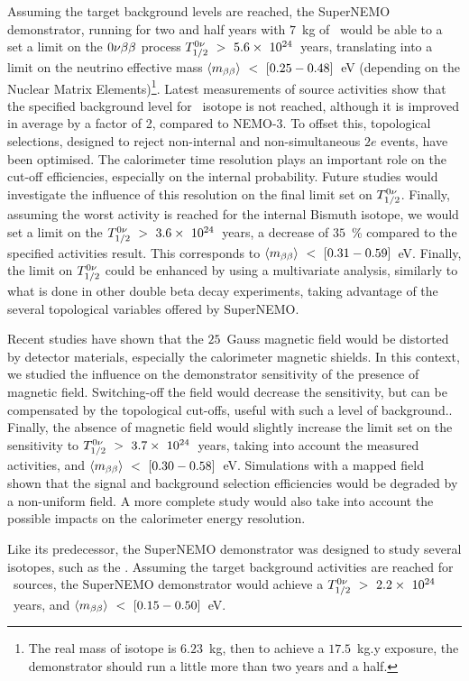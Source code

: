 Assuming the target background levels are reached, the SuperNEMO demonstrator, running for two and half years with $7$~kg of \Se\ would be able to a set a limit on the $0\nu\beta\beta$ process $T_{1/2}^{0\nu}~>~5.6\times~10^{24}$~years, translating into a limit on the neutrino effective mass $\langle m_{\beta\beta}\rangle~<~[0.25-0.48]$~eV (depending on the Nuclear Matrix Elements)\footnote{The real mass of isotope is $6.23$~kg, then to achieve a $17.5$~kg.y exposure, the demonstrator should run a little more than two years and a half.}.
Latest measurements of source activities show that the specified background level for \Tl\ isotope is not reached, although it is improved in average by a factor of 2, compared to NEMO-$3$.
To offset this, topological selections, designed to reject non-internal and non-simultaneous $2e$ events, have been optimised.
The calorimeter time resolution plays an important role on the cut-off efficiencies, especially on the internal probability.
Future studies would investigate the influence of this resolution on the final limit set on $T_{1/2}^{0\nu}$.
Finally, assuming the worst activity is reached for the internal Bismuth isotope, we would set a limit on the $T_{1/2}^{0\nu}~>~3.6\times~10^{24}$~years, a decrease of $35$~\% compared to the specified activities result.
This corresponds to $\langle m_{\beta\beta}\rangle~<~[0.31-0.59]$~eV.
Finally, the limit on $T_{1/2}^{0\nu}$ could be enhanced by using a multivariate analysis, similarly to what is done in other double beta decay experiments, taking advantage of the several topological variables offered by SuperNEMO.

Recent studies have shown that the $25$~Gauss magnetic field would be distorted by detector materials, especially the calorimeter magnetic shields.
In this context, we studied the influence on the demonstrator sensitivity of the presence of magnetic field.
Switching-off the field would decrease the sensitivity, but can be compensated by the topological cut-offs, useful with such a level of background..
Finally, the absence of magnetic field would slightly increase the limit set on the sensitivity to $T_{1/2}^{0\nu}~>~3.7\times~10^{24}$~years, taking into account the measured activities, and $\langle m_{\beta\beta}\rangle~<~[0.30-0.58]$~eV.
Simulations with a mapped field shown that the signal and background selection efficiencies would be degraded by a non-uniform field.
A more complete study would also take into account the possible impacts on the calorimeter energy resolution.

Like its predecessor, the SuperNEMO demonstrator was designed to study several isotopes, such as the \Nd.
Assuming the target background activities are reached for \Nd\ sources, the SuperNEMO demonstrator would achieve a $T_{1/2}^{0\nu}~>~2.2\times~10^{24}$~years, and $\langle m_{\beta\beta}\rangle~<~[0.15-0.50]$~eV.

